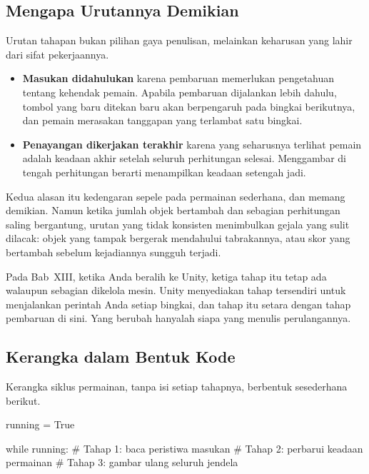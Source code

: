 \subsection{Mengapa Urutannya Demikian}

Urutan tahapan bukan pilihan gaya penulisan, melainkan keharusan yang lahir
dari sifat pekerjaannya.

\begin{itemize}
  \item \textbf{Masukan didahulukan} karena pembaruan memerlukan pengetahuan
        tentang kehendak pemain. Apabila pembaruan dijalankan lebih dahulu,
        tombol yang baru ditekan baru akan berpengaruh pada bingkai berikutnya,
        dan pemain merasakan tanggapan yang terlambat satu bingkai.
  \item \textbf{Penayangan dikerjakan terakhir} karena yang seharusnya terlihat
        pemain adalah keadaan akhir setelah seluruh perhitungan selesai.
        Menggambar di tengah perhitungan berarti menampilkan keadaan setengah
        jadi.
\end{itemize}

Kedua alasan itu kedengaran sepele pada permainan sederhana, dan memang
demikian. Namun ketika jumlah objek bertambah dan sebagian perhitungan saling
bergantung, urutan yang tidak konsisten menimbulkan gejala yang sulit
dilacak: objek yang tampak bergerak mendahului tabrakannya, atau skor yang
bertambah sebelum kejadiannya sungguh terjadi.

\begin{catatabox}
Pada Bab~XIII, ketika Anda beralih ke Unity, ketiga tahap itu tetap ada
walaupun sebagian dikelola mesin. Unity menyediakan tahap tersendiri untuk
menjalankan perintah Anda setiap bingkai, dan tahap itu setara dengan tahap
pembaruan di sini. Yang berubah hanyalah siapa yang menulis perulangannya.
\end{catatabox}

\subsection{Kerangka dalam Bentuk Kode}

Kerangka siklus permainan, tanpa isi setiap tahapnya, berbentuk sesederhana
berikut.

\begin{kodekeluaran}
running = True

while running:
    # Tahap 1: baca peristiwa masukan
    # Tahap 2: perbarui keadaan permainan
    # Tahap 3: gambar ulang seluruh jendela
\end{kodekeluaran}

